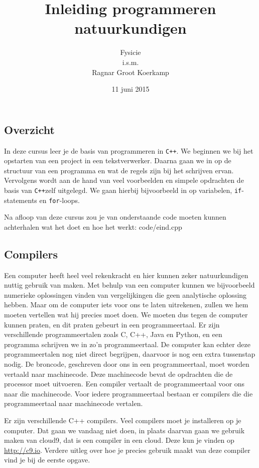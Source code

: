\documentclass[12pt,a4paper]{article}
\title{Inleiding programmeren natuurkundigen}
\author{
Fysicie\\
i.s.m.\\
Ragnar Groot Koerkamp
}
\date{11 juni 2015}
\newcommand{\code}{}
\newcommand{\icode}{\lstinline}
\newcommand{\mono}{\texttt}
\newcommand{\cpp}{\mono{C++}}
\begin{document}
 
\maketitle

\tableofcontents
\subsection{Overzicht}
In deze cursus leer je de basis van programmeren in \cpp. We beginnen we bij het opstarten van een project in een tekstverwerker. Daarna gaan we in op de structuur van een programma en wat de regels zijn bij het schrijven ervan. Vervolgens wordt aan de hand van veel voorbeelden en simpele opdrachten de basis van \cpp zelf	 uitgelegd. We gaan hierbij bijvoorbeeld in op variabelen, \icode{if}-statements en \icode{for}-loops.

Na afloop van deze cursus zou je van onderstaande code moeten kunnen achterhalen wat het doet en hoe het werkt:
\code{code/eind.cpp}
\subsection{Compilers}
Een computer heeft heel veel rekenkracht en hier kunnen zeker natuurkundigen nuttig gebruik van maken. Met behulp van een computer kunnen we bijvoorbeeld numerieke oplossingen vinden van vergelijkingen die geen analytische oplossing hebben. Maar om de computer iets voor ons te laten uitrekenen, zullen we hem moeten vertellen wat hij precies moet doen. We moeten dus tegen de computer kunnen praten, en dit praten gebeurt in een programmeertaal. Er zijn verschillende programmeertalen zoals C, C++, Java en Python, en een programma schrijven we in zo'n programmeertaal. De computer kan echter deze programmeertalen nog niet direct begrijpen, daarvoor is nog een extra tussenstap nodig. De broncode, geschreven door ons in een programmeertaal, moet worden vertaald naar machinecode. Deze machinecode bevat de opdrachten die de processor moet uitvoeren. Een compiler vertaalt de programmeertaal voor ons naar die machinecode. Voor iedere programmeertaal bestaan er compilers die die programmeertaal naar machinecode vertalen.

Er zijn verschillende C++ compilers. Veel compilers moet je installeren op je computer. Dat gaan we vandaag niet doen, in plaats daarvan gaan we gebruik maken van cloud9, dat is een compiler in een cloud. Deze kun je vinden op \url{http://c9.io}. Verdere uitleg over hoe je precies gebruik maakt van deze compiler vind je bij de eerste opgave.
\end{document}
